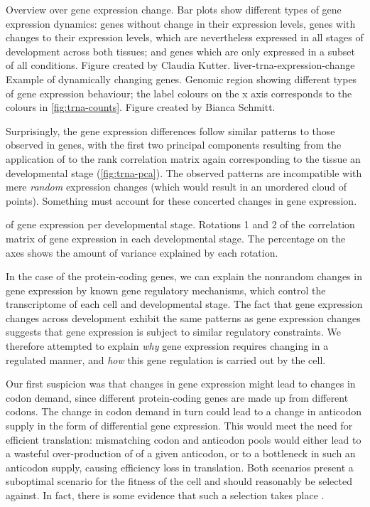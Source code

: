     {Overview over \trna gene expression change.}
    {Bar plots show different types of \trna gene expression dynamics: \trna
    genes without change in their expression levels, \trna genes with changes to
    their expression levels, which are nevertheless expressed in all stages of
    development across both tissues; and \trna genes which are only expressed in
    a subset of all conditions. Figure created by Claudia Kutter.}
    {liver-trna-expression-change}
    {Example of dynamically changing \trna genes.}
    {Genomic region showing different types of \trna gene expression behaviour;
    the label colours on the x axis corresponds to the colours in
    \cref{fig:trna-counts}. Figure created by Bianca Schmitt.}

Surprisingly, the \trna gene expression differences follow similar patterns to
those observed in \mrna genes, with the first two principal components resulting
from the application of \pca to the rank correlation matrix again corresponding
to the tissue an developmental stage (\cref{fig:trna-pca}). The observed
patterns are incompatible with mere \emph{random} expression changes (which
would result in an unordered cloud of points). Something must account for these
concerted changes in \trna gene expression.

    {\pca of \trna gene expression per developmental stage.}
    {Rotations \num{1} and \num{2} of the correlation matrix of
    \trna gene expression in each developmental stage. The percentage on the
    axes shows the amount of variance explained by each rotation.}

In the case of the protein-coding genes, we can explain the nonrandom changes in
gene expression by known gene regulatory mechanisms, which control the
transcriptome of each cell and developmental stage. The fact that \trna gene
expression changes across development exhibit the same patterns as \mrna gene
expression changes suggests that \trna gene expression is subject to similar
regulatory constraints. We therefore attempted to explain \emph{why} \trna gene
expression requires changing in a regulated manner, and \emph{how} this \trna
gene regulation is carried out by the cell.

Our first suspicion was that changes in \mrna gene expression might lead to
changes in codon demand, since different protein-coding genes are made up from
different codons. The change in codon demand in turn could lead to a change in
anticodon supply in the form of differential \trna gene expression. This would
meet the need for efficient translation: mismatching codon and anticodon pools
would either lead to a wasteful over-production of \trna[s] of a given
anticodon, or to a bottleneck in such an anticodon supply, causing efficiency
loss in translation. Both scenarios present a suboptimal scenario for the
fitness of the cell and should reasonably be selected against. In fact, there is
some evidence that such a selection takes place
\citep{Ikemura:1981,Ikemura:1985,Yang:2008}.

